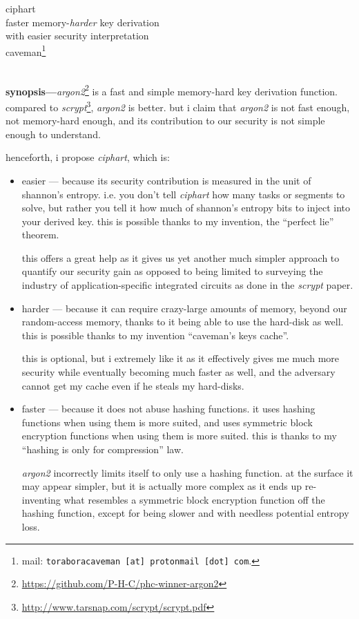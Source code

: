 \documentclass[twocolumn]{article}
\begin{document}
\SetInd{.15em}{1em}

\begin{center}
\Huge
ciphart\\
\Large
faster memory-\emph{harder} key derivation \\
with easier security interpretation\\
\normalsize
caveman\footnote{mail: \texttt{toraboracaveman [at] protonmail [dot]
com}.}\\
\footnotesize
\DTMnow\\
\end{center}

\noindent\textbf{synopsis---}\emph{argon2}\footnote{\url{https://github.com/P-H-C/phc-winner-argon2}}
is a fast and simple memory-hard key derivation function.  compared to
\emph{scrypt}\footnote{\url{http://www.tarsnap.com/scrypt/scrypt.pdf}},
\emph{argon2} is better.  but i claim that \emph{argon2} is not fast
enough, not memory-hard enough, and its contribution to our security is not
simple enough to understand.

henceforth, i propose \emph{ciphart}, which is:
\begin{itemize}
    \item easier --- because its security contribution is measured in the
    unit of shannon's entropy.  i.e. you don't tell \emph{ciphart} how many
    tasks or segments to solve, but rather you tell it how much of
    shannon's entropy bits to inject into your derived key.  this is
    possible thanks to my invention, the ``perfect lie'' theorem.

    this offers a great help as it gives us yet another much simpler
    approach to quantify our security gain as opposed to being limited to
    surveying the industry of application-specific integrated circuits as
    done in the \emph{scrypt} paper.

    \item harder --- because it can require crazy-large amounts of memory,
    beyond our random-access memory, thanks to it being able to use the
    hard-disk as well.  this is possible thanks to my invention ``caveman's
    keys cache''.

    this is optional, but i extremely like it as it effectively gives me
    much more security while eventually becoming much faster as well, and
    the adversary cannot get my cache even if he steals my hard-disks.

    \item faster --- because it does not abuse hashing functions.  it uses
    hashing functions when using them is more suited, and uses symmetric
    block encryption functions when using them is  more suited.  this is
    thanks to my ``hashing is only for compression'' law.

    \emph{argon2} incorrectly limits itself to only use a hashing function.
    at the surface it may appear simpler, but it is actually more complex
    as it ends up re-inventing what resembles a symmetric block encryption
    function off the hashing function, except for being slower and with
    needless potential entropy loss.
\end{itemize}
\end{document}

